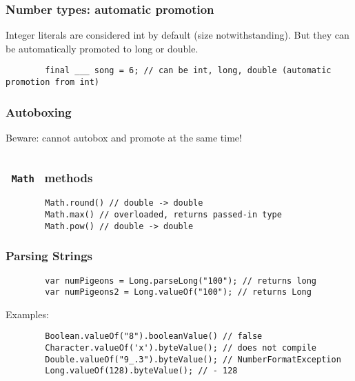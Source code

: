 \documentclass{scrartcl}
\begin{document}
\subsubsection{Number types: automatic promotion}

    Integer literals are considered int by default (size notwithstanding). But they can be automatically promoted to long or double.

    \begin{lstlisting}
        final ___ song = 6; // can be int, long, double (automatic promotion from int)
    \end{lstlisting}

\subsubsection{Autoboxing}

    Beware: cannot autobox and promote at the same time!

    \begin{lstlisting}

    \end{lstlisting}


\subsubsection{\lstinline$ Math $ methods}
    \begin{lstlisting}
        Math.round() // double -> double
        Math.max() // overloaded, returns passed-in type
        Math.pow() // double -> double
    \end{lstlisting}

\subsubsection{Parsing Strings}
    \begin{lstlisting}
        var numPigeons = Long.parseLong("100"); // returns long
        var numPigeons2 = Long.valueOf("100"); // returns Long
    \end{lstlisting}

    Examples:
    \begin{lstlisting}
        Boolean.valueOf("8").booleanValue() // false
        Character.valueOf('x').byteValue(); // does not compile
        Double.valueOf("9_.3").byteValue(); // NumberFormatException
        Long.valueOf(128).byteValue(); // - 128
    \end{lstlisting}
\end{document}
